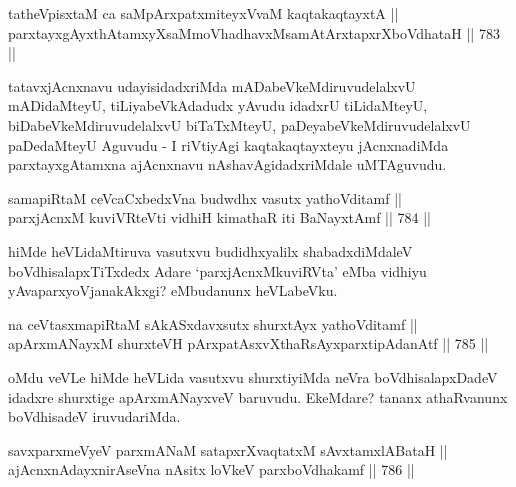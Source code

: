\begin{shl}
tatheVpisxtaM ca saMpArxpatxmiteyxVvaM kaqtakaqtayxtA || \\
parxtayxgAyxthAtamxyXsaMmoVhadhavxMsamAtArxtapxrXboVdhataH \hfill || 783 ||  
\end{shl}

\begin{artha} 
tatavxjAcnxnavu udayisidadxriMda mADabeVkeMdiruvudelalxvU mADidaMteyU, tiLiyabeVkAdadudx yAvudu idadxrU tiLidaMteyU, biDabeVkeMdiruvudelalxvU biTaTxMteyU, paDeyabeVkeMdiruvudelalxvU paDedaMteyU Aguvudu - I riVtiyAgi kaqtakaqtayxteyu jAcnxnadiMda parxtayxgAtamxna ajAcnxnavu nAshavAgidadxriMdale uMTAguvudu.
\end{artha}


\begin{shl}
samapiRtaM ceVcaCxbedxVna budwdhx vasutx yathoVditamf || \\
parxjAcnxM kuviVRteVti vidhiH kimathaR iti BaNayxtAmf \hfill || 784 ||  
\end{shl}

\begin{artha} 
hiMde heVLidaMtiruva vasutxvu budidhxyalilx shabadxdiMdaleV boVdhisalapxTiTxdedx Adare `parxjAcnxMkuviRVta' eMba vidhiyu yAva\break parxyoVjanakAkxgi? eMbudanunx heVLabeVku.
\end{artha}

\begin{shl}
na ceVtasxmapiRtaM sAkASxdavxsutx shurxtAyx yathoVditamf ||  \\
apArxmANayxM shurxteVH pArxpatAsxvXthaRsAyxparxtipAdanAtf \hfill || 785 ||  
\end{shl}

\begin{artha} 
oMdu veVLe hiMde heVLida vasutxvu shurxtiyiMda neVra boVdhi\-\break salapxDadeV idadxre shurxtige apArxmANayxveV baruvudu. EkeMdare? tananx athaRvanunx boVdhisadeV iruvudariMda.
\end{artha}


\begin{shl}
savxparxmeVyeV parxmANaM satapxrXvaqtatxM sAvxtamxlABataH || \\
ajAcnxnAdayxnirAseVna nAsitx loVkeV parxboVdhakamf \hfill || 786 ||  
\end{shl}


